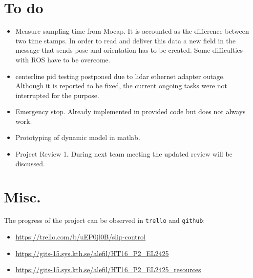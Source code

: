 \documentclass[oneside,12pt]{article}
\begin{document}
\section{To do}

\begin{itemize}
  \item Measure sampling time from Mocap. It is accounted as the difference
    between two time stamps. In order to read and deliver this data a new field
    in the message that sends pose and orientation has to be created. Some
    difficulties with ROS have to be overcome.

  \item centerline pid testing postponed due to lidar ethernet adapter outage.
    Although it is reported to be fixed, the current ongoing tasks were not
    interrupted for the purpose.

  \item Emergency stop. Already implemented in provided code but does not
    always work.

  \item Prototyping of dynamic model in matlab.

  \item Project Review 1. During next team meeting the updated review will
    be discussed.

\end{itemize}


\section{Misc.}

The progress of the project can be observed in \texttt{trello} and \texttt{github}:

\begin{itemize}
  \item \url{https://trello.com/b/uEP0jl0B/slip-control}
  \item \url{https://gits-15.sys.kth.se/alefil/HT16_P2_EL2425}
  \item \url{https://gits-15.sys.kth.se/alefil/HT16_P2_EL2425_resources}
\end{itemize}
\end{document}
